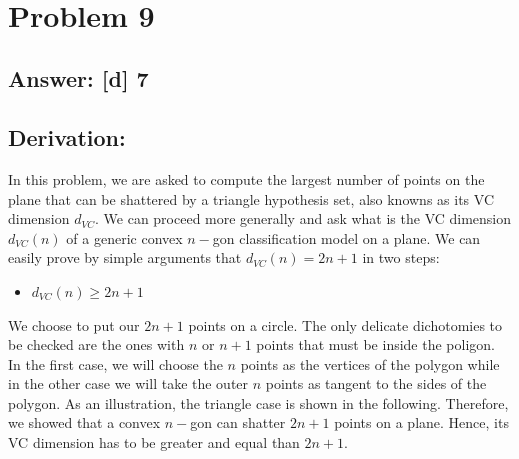 \documentclass[11pt]{article}
\providecommand{\tightlist}{%
      \setlength{\itemsep}{0pt}\setlength{\parskip}{0pt}}
\begin{document}
    \begin{center}
    \end{center}
    { \hspace*{\fill} \\}
    
    \hypertarget{problem-9}{%
\section{Problem 9}\label{problem-9}}

\hypertarget{answer-d-7}{%
\subsection{Answer: {[}d{]} 7}\label{answer-d-7}}

\hypertarget{derivation}{%
\subsection{Derivation:}\label{derivation}}

In this problem, we are asked to compute the largest number of points on
the plane that can be shattered by a triangle hypothesis set, also
knowns as its VC dimension \(d_{VC}\). We can proceed more generally and
ask what is the VC dimension \(d_{VC}(n)\) of a generic convex \(n-\)gon
classification model on a plane. We can easily prove by simple arguments
that \(d_{VC}(n)=2n+1\) in two steps:

\begin{itemize}
\tightlist
\item
  \(d_{VC}(n)\ge2n+1\)
\end{itemize}

We choose to put our \(2n+1\) points on a circle. The only delicate
dichotomies to be checked are the ones with \(n\) or \(n+1\) points that
must be inside the poligon. In the first case, we will choose the \(n\)
points as the vertices of the polygon while in the other case we will
take the outer \(n\) points as tangent to the sides of the polygon. As
an illustration, the triangle case is shown in the following. Therefore,
we showed that a convex \(n-\)gon can shatter \(2n+1\) points on a
plane. Hence, its VC dimension has to be greater and equal than
\(2n+1\).
\end{document}

